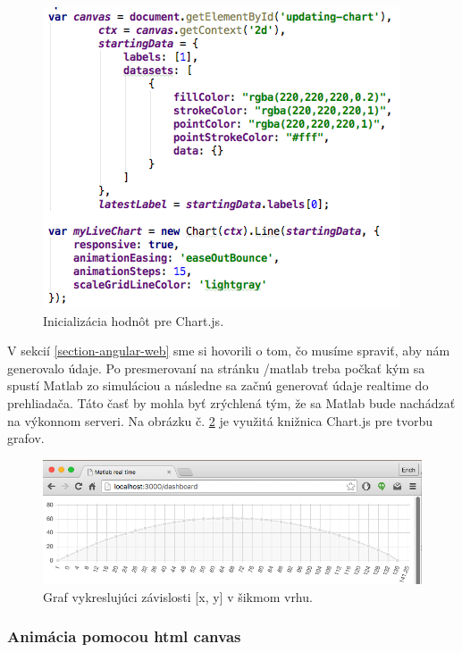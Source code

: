 \begin{figure}[H]
  \centering
  \includegraphics[scale=0.7]{img/code/angular-chartjs-code.png}
  \caption{Inicializácia hodnôt pre Chart.js.}
  \label{img-angular-chartjs-canvas}
\end{figure}

V sekcií \ref{section-angular-web} sme si hovorili o tom, čo musíme spraviť, aby nám generovalo údaje. Po presmerovaní na stránku /matlab treba počkať kým sa spustí Matlab zo simuláciou a následne sa začnú generovať údaje realtime do prehliadača. Táto časť by mohla byť zrýchlená tým, že sa Matlab bude nachádzať na výkonnom serveri. Na obrázku č. \ref{img-angular-chartjs} je využitá knižnica Chart.js pre tvorbu grafov.

\begin{figure}[H]
  \centering
  \includegraphics[scale=0.5]{img/code/angular-chartjs.png}
  \caption{Graf vykreslujúci závislosti [x, y] v šikmom vrhu.}
  \label{img-angular-chartjs}
\end{figure}

\subsubsection{Animácia pomocou html canvas}\label{section-canvas}

